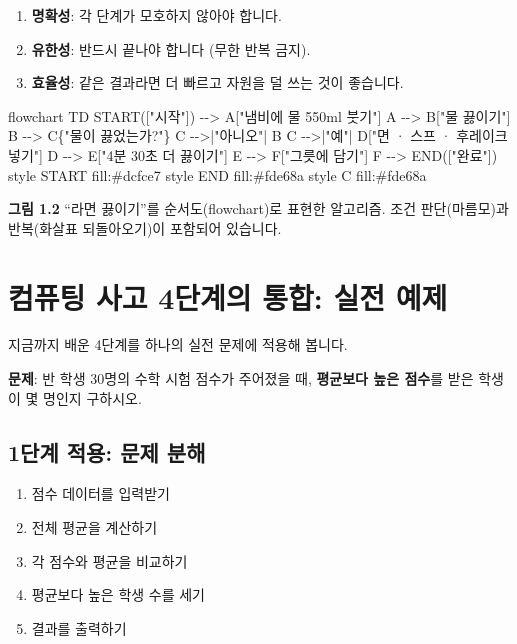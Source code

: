 \documentclass[
  korean,
  11pt,
  a4paper,
  DIV=11,
  numbers=noendperiod]{scrreprt}
\newenvironment{Shaded}{\begin{snugshade}}{\end{snugshade}}
\newcommand{\NormalTok}[1]{\textcolor[rgb]{0.00,0.23,0.31}{#1}}
\providecommand{\tightlist}{%
  \setlength{\itemsep}{0pt}\setlength{\parskip}{0pt}}
\begin{document}
\begin{enumerate}
\def\labelenumi{\arabic{enumi}.}
\tightlist
\item
  \textbf{명확성}: 각 단계가 모호하지 않아야 합니다.
\item
  \textbf{유한성}: 반드시 끝나야 합니다 (무한 반복 금지).
\item
  \textbf{효율성}: 같은 결과라면 더 빠르고 자원을 덜 쓰는 것이 좋습니다.
\end{enumerate}

\begin{Shaded}
\begin{Highlighting}[]
\NormalTok{flowchart TD}
\NormalTok{    START(["시작"]) {-}{-}\textgreater{} A["냄비에 물 550ml 붓기"]}
\NormalTok{    A {-}{-}\textgreater{} B["물 끓이기"]}
\NormalTok{    B {-}{-}\textgreater{} C\{"물이 끓었는가?"\}}
\NormalTok{    C {-}{-}\textgreater{}|"아니오"| B}
\NormalTok{    C {-}{-}\textgreater{}|"예"| D["면 · 스프 · 후레이크 넣기"]}
\NormalTok{    D {-}{-}\textgreater{} E["4분 30초 더 끓이기"]}
\NormalTok{    E {-}{-}\textgreater{} F["그릇에 담기"]}
\NormalTok{    F {-}{-}\textgreater{} END(["완료"])}
\NormalTok{    style START fill:\#dcfce7}
\NormalTok{    style END fill:\#fde68a}
\NormalTok{    style C fill:\#fde68a}
\end{Highlighting}
\end{Shaded}

\textbf{그림 1.2} ``라면 끓이기''를 순서도(flowchart)로 표현한 알고리즘.
조건 판단(마름모)과 반복(화살표 되돌아오기)이 포함되어 있습니다.

\section{컴퓨팅 사고 4단계의 통합: 실전 예제}\label{sec-ct-example}

지금까지 배운 4단계를 하나의 실전 문제에 적용해 봅니다.

\textbf{문제}: 반 학생 30명의 수학 시험 점수가 주어졌을 때,
\textbf{평균보다 높은 점수}를 받은 학생이 몇 명인지 구하시오.

\subsection{1단계 적용: 문제
분해}\label{uxb2e8uxacc4-uxc801uxc6a9-uxbb38uxc81c-uxbd84uxd574}

\begin{enumerate}
\def\labelenumi{\arabic{enumi}.}
\tightlist
\item
  점수 데이터를 입력받기
\item
  전체 평균을 계산하기
\item
  각 점수와 평균을 비교하기
\item
  평균보다 높은 학생 수를 세기
\item
  결과를 출력하기
\end{enumerate}
\end{document}
